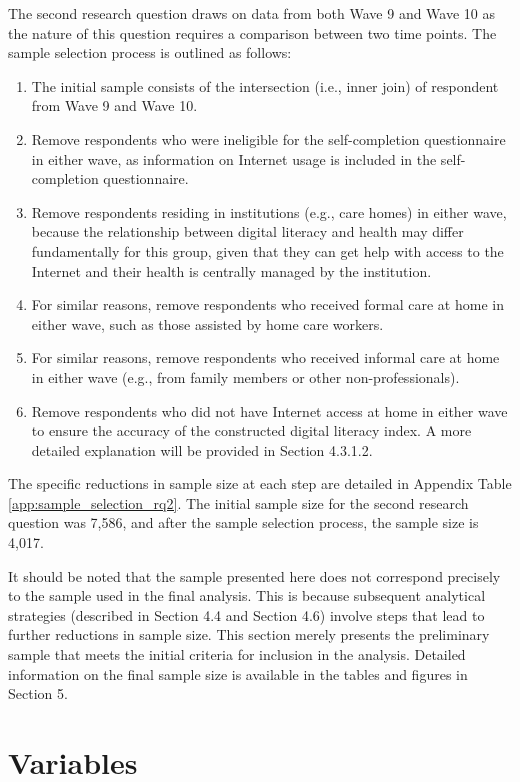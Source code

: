 The second research question draws on data from both Wave 9 and Wave 10 as the nature of this question requires a comparison between two time points. The sample selection process is outlined as follows:

\begin{enumerate}
    \item The initial sample consists of the intersection (i.e., inner join) of respondent from Wave 9 and Wave 10.
    \item Remove respondents who were ineligible for the self-completion questionnaire in either wave, as information on Internet usage is included in the self-completion questionnaire.
    \item Remove respondents residing in institutions (e.g., care homes) in either wave, because the relationship between digital literacy and health may differ fundamentally for this group, given that they can get help with access to the Internet and their health is centrally managed by the institution.
    \item For similar reasons, remove respondents who received formal care at home in either wave, such as those assisted by home care workers.
    \item For similar reasons, remove respondents who received informal care at home in either wave (e.g., from family members or other non-professionals).
    \item Remove respondents who did not have Internet access at home in either wave to ensure the accuracy of the constructed digital literacy index. A more detailed explanation will be provided in Section 4.3.1.2.
\end{enumerate}

The specific reductions in sample size at each step are detailed in Appendix Table \ref{app:sample_selection_rq2}. The initial sample size for the second research question was 7,586, and after the sample selection process, the sample size is 4,017.

It should be noted that the sample presented here does not correspond precisely to the sample used in the final analysis. This is because subsequent analytical strategies (described in Section 4.4 and Section 4.6) involve steps that lead to further reductions in sample size. This section merely presents the preliminary sample that meets the initial criteria for inclusion in the analysis. Detailed information on the final sample size is available in the tables and figures in Section 5.

\section{Variables}

